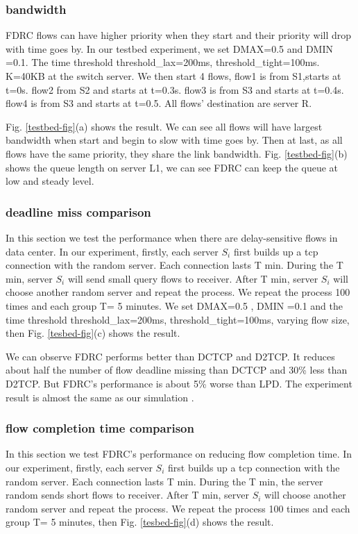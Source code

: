 \documentclass[10pt, conference, letterpaper]{IEEEtran}
\begin{document}
\subsubsection{bandwidth}

FDRC flows can have higher priority when they start and their priority will drop with time goes by.
In our testbed experiment, we set DMAX=0.5 and DMIN =0.1. The time threshold threshold\_{lax}=200ms, threshold\_{tight}=100ms.
K=40KB at the switch server.
We then start 4 flows, flow1 is from S1,starts at t=0s. flow2 from S2 and starts at t=0.3s. 
flow3 is from S3 and starts at t=0.4s. flow4 is from S3 and starts at t=0.5. All flows' destination are server R.


Fig. \ref{testbed-fig}(a) shows the result. We can see all flows will have largest bandwidth when start and begin to slow with time goes by.
Then at last, as all flows have the same priority, they share the link bandwidth. Fig. \ref{testbed-fig}(b) shows the queue length on server L1, we can see FDRC
can keep the queue at low and steady level.

\subsubsection{deadline miss comparison}

In this section we test the performance when there are delay-sensitive flows in data center.
In our experiment, firstly, each server $S_{i}$ first builds up a tcp connection with the random server. Each connection lasts T min. During the T min,
server $S_{i}$ will send small query flows to receiver. After T min, server $S_{i}$ will choose another random server and repeat the process.
We repeat the process 100 times and each group T= 5 minutes. 
We set DMAX=0.5 , DMIN =0.1 and the time threshold threshold\_{lax}=200ms, threshold\_{tight}=100ms, varying flow size,
then Fig. \ref{tesbed-fig}(c) shows the result.

We can observe FDRC performs better than DCTCP and D2TCP. It reduces about half the number of flow deadline missing than DCTCP and 
30\% less than D2TCP. But FDRC's performance is about 5\% worse than LPD.
The experiment result is almost the same as our simulation .
 
\subsubsection{flow completion time comparison}

In this section we test FDRC's performance on reducing flow completion time. In our experiment, firstly, each server $S_{i}$ first builds up a tcp connection with the random server.
 Each connection lasts T min. During the T min, the server random sends
 short flows to receiver.  After T min, server $S_{i}$ will choose another random server and repeat the process. We repeat the process 100 times and each group T= 5 minutes, then
Fig. \ref{tesbed-fig}(d) shows the result.
\end{document}

